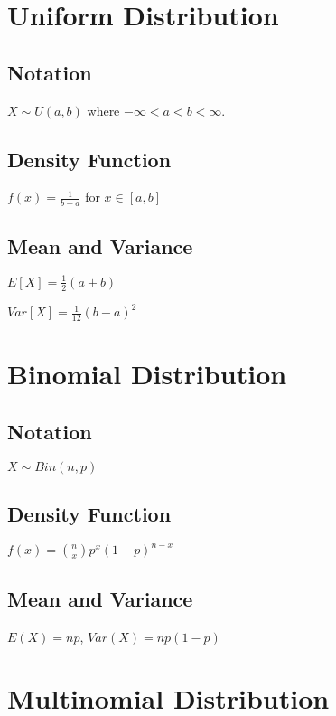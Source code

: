\documentclass{article}
\begin{document}
\begin{multicols*}{3}

\section{Uniform Distribution}
\label{sec:uniform-dist}

\subsection*{Notation}

$X \sim U(a,b)$ where $-\infty < a < b < \infty$.

\subsection*{Density Function}

$f(x) = \frac{1}{b - a}$ for $x \in [a,b]$

\subsection*{Mean and Variance}

$E[X] = \frac{1}{2}(a + b)$

$Var[X] = \frac{1}{12}(b - a)^2$

\section{Binomial Distribution}
\label{sec:binom-dist}

\subsection*{Notation}

$X \sim Bin(n, p)$

\subsection*{Density Function}

$f(x) = {n \choose x} p^{x} (1-p)^{n-x}$

\subsection*{Mean and Variance}

$E(X) = np$, $Var(X) = np(1-p)$

\section{Multinomial Distribution}
\label{sec:multinomial-dist}


\end{multicols*}
\end{document}
